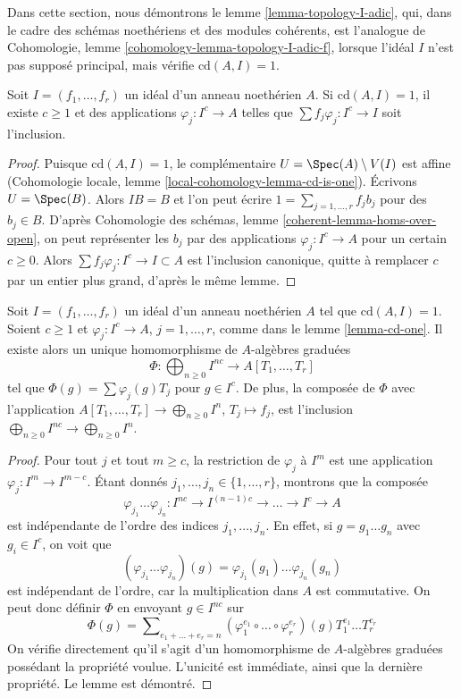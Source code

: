 \noindent
Dans cette section, nous démontrons le lemme \ref{lemma-topology-I-adic},
qui, dans le cadre des schémas noethériens et des modules cohérents,
est l'analogue de Cohomologie, lemme \ref{cohomology-lemma-topology-I-adic-f},
lorsque l'idéal $I$ n'est pas supposé principal, mais
vérifie $\text{cd}(A, I) = 1$.

\begin{lemma}
\label{lemma-cd-one}
Soit $I = (f_1, \ldots, f_r)$ un idéal d'un anneau noethérien $A$.
Si $\text{cd}(A, I) = 1$, il existe $c \geq 1$ et des applications
$\varphi_j : I^c \to A$ telles que $\sum f_j \varphi_j : I^c \to I$
soit l'inclusion.
\end{lemma}

\begin{proof}
Puisque $\text{cd}(A, I) = 1$, le complémentaire $U = \Spec(A) \setminus V(I)$
est affine (Cohomologie locale, lemme \ref{local-cohomology-lemma-cd-is-one}).
Écrivons $U = \Spec(B)$. Alors $IB = B$
et l'on peut écrire $1 = \sum_{j = 1, \ldots, r} f_j b_j$
pour des $b_j \in B$. D'après
Cohomologie des schémas, lemme \ref{coherent-lemma-homs-over-open},
on peut représenter les $b_j$ par des applications $\varphi_j : I^c \to A$
pour un certain $c \geq 0$. Alors $\sum f_j \varphi_j : I^c \to I \subset A$
est l'inclusion canonique, quitte à remplacer $c$ par un entier
plus grand, d'après le même lemme.
\end{proof}

\begin{lemma}
\label{lemma-cd-one-extend}
Soit $I = (f_1, \ldots, f_r)$ un idéal d'un anneau noethérien $A$
tel que $\text{cd}(A, I) = 1$. Soient $c \geq 1$ et $\varphi_j : I^c \to A$,
$j = 1, \ldots, r$, comme dans le lemme \ref{lemma-cd-one}.
Il existe alors un unique homomorphisme de $A$-algèbres graduées
$$
\Phi : \bigoplus\nolimits_{n \geq 0} I^{nc} \to A[T_1, \ldots, T_r]
$$
tel que $\Phi(g) = \sum \varphi_j(g) T_j$ pour $g \in I^c$.
De plus, la composée de $\Phi$ avec l'application
$A[T_1, \ldots, T_r] \to \bigoplus_{n \geq 0} I^n$,
$T_j \mapsto f_j$, est l'inclusion
$\bigoplus_{n \geq 0} I^{nc} \to \bigoplus_{n \geq 0} I^n$.
\end{lemma}

\begin{proof}
Pour tout $j$ et tout $m \geq c$, la restriction de $\varphi_j$ à
$I^m$ est une application $\varphi_j : I^m \to I^{m - c}$.
Étant donnés $j_1, \ldots, j_n \in \{1, \ldots, r\}$, montrons que la
composée
$$
\varphi_{j_1} \ldots \varphi_{j_n} :
I^{nc} \to I^{(n - 1)c} \to \ldots \to I^c \to A
$$
est indépendante de l'ordre des indices $j_1, \ldots, j_n$.
En effet, si $g = g_1 \ldots g_n$ avec $g_i \in I^c$, on
voit que
$$
(\varphi_{j_1} \ldots \varphi_{j_n})(g) =
\varphi_{j_1}(g_1) \ldots \varphi_{j_n}(g_n)
$$
est indépendant de l'ordre, car la multiplication dans $A$ est commutative.
On peut donc définir $\Phi$ en envoyant $g \in I^{nc}$ sur
$$
\Phi(g) = \sum\nolimits_{e_1 + \ldots + e_r = n}
(\varphi_1^{e_1} \circ \ldots \circ \varphi_r^{e_r})(g)
T_1^{e_1} \ldots T_r^{e_r}
$$
On vérifie directement qu'il s'agit d'un homomorphisme de $A$-algèbres
graduées possédant la propriété voulue. L'unicité est immédiate,
ainsi que la dernière propriété. Le lemme est démontré.
\end{proof}

